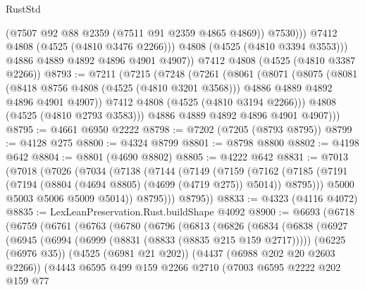\begin{lexlean}{RustStd}
\begin{coremodule}
{\begin{coremodule}
{{{{{{{{{{{{{{                  (@7507 @92 @88 @2359 (@7511 @91 @2359 @4865 @4869))
                  @7530)))
            @7412
            @4808
            (@4525 (@4810 @3476 @2266)))
          @4808
          (@4525 (@4810 @3394 @3553)))
        @4886
        @4889
        @4892
        @4896
        @4901
        @4907))
    @7412
    @4808
    (@4525 (@4810 @3387 @2266))
@8793 := @7211
    (@7215
      (@7248
        (@7261
          (@8061
            (@8071
              (@8075
                (@8081
                  (@8418 @8756 @4808 (@4525 (@4810 @3201 @3568)))
                  @4886
                  @4889
                  @4892
                  @4896
                  @4901
                  @4907))
              @7412
              @4808
              (@4525 (@4810 @3194 @2266)))
            @4808
            (@4525 (@4810 @2793 @3583)))
          @4886
          @4889
          @4892
          @4896
          @4901
          @4907)))
@8795 := @4661 @6950 @2222
@8798 := @7202 (@7205 (@8793 @8795))
@8799 := @4128 @275
@8800 := @4324 @8799
@8801 := @8798 @8800
@8802 := @4198 @642
@8804 := @8801 (@4690 @8802)
@8805 := @4222 @642
@8831 := @7013
    (@7018
      (@7026
        (@7034
          (@7138
            (@7144
              (@7149
                (@7159
                  (@7162
                    (@7185 (@7191 (@7194 (@8804 (@4694 @8805) (@4699 (@4719 @275)) @5014)) @8795)))
                  @5000
                  @5003
                  @5006
                  @5009
                  @5014))
              @8795)))
        @8795))
@8833 := @4323 (@4116 @4072)
@8835 := LexLeanPreservation.Rust.buildShape @4092
@8900 := @6693
    (@6718
      (@6759
        (@6761
          (@6763
            (@6780
              (@6796
                (@6813
                  (@6826
                    (@6834
                      (@6838
                        (@6927
                          (@6945
                            (@6994 (@6999 (@8831 (@8833 (@8835 @215 @159 @2717)))))
                            (@6225 (@6976 @35))
                            (@4525 (@6981 @21 @202))
                            (@4437 (@6988 @202 @20 @2603 @2266))
                            (@4443
                              @6595
                              @499
                              @159
                              @2266
                              @2710
                              (@7003
                                @6595
                                @2222
                                @202
                                @159
                                @77
}}}}}}}}}}}}}}
\end{coremodule}}
\end{coremodule}
\end{lexlean}

